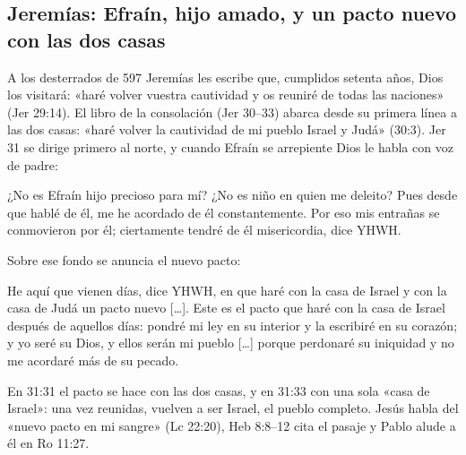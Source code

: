 \subsection{Jeremías: Efraín, hijo amado, y un pacto nuevo con las dos casas}
A los desterrados de 597 Jeremías les escribe que, cumplidos setenta años, Dios los visitará: «haré volver vuestra cautividad y os reuniré de todas las naciones» (Jer 29:14). El libro de la consolación (Jer 30--33) abarca desde su primera línea a las dos casas: «haré volver la cautividad de mi pueblo Israel y Judá» (30:3). Jer 31 se dirige primero al norte, y cuando Efraín se arrepiente Dios le habla con voz de padre:
\begin{cita}¿No es Efraín hijo precioso para mí? ¿No es niño en quien me deleito? Pues desde que hablé de él, me he acordado de él constantemente. Por eso mis entrañas se conmovieron por él; ciertamente tendré de él misericordia, dice YHWH.\end{cita}
Sobre ese fondo se anuncia el nuevo pacto:
\begin{cita}He aquí que vienen días, dice YHWH, en que haré con la casa de Israel y con la casa de Judá un pacto nuevo [\ldots]. Este es el pacto que haré con la casa de Israel después de aquellos días: pondré mi ley en su interior y la escribiré en su corazón; y yo seré su Dios, y ellos serán mi pueblo [\ldots] porque perdonaré su iniquidad y no me acordaré más de su pecado.\end{cita}
En 31:31 el pacto se hace con las dos casas, y en 31:33 con una sola «casa de Israel»: una vez reunidas, vuelven a ser Israel, el pueblo completo. Jesús habla del «nuevo pacto en mi sangre» (Lc 22:20), Heb 8:8--12 cita el pasaje y Pablo alude a él en Ro 11:27.

